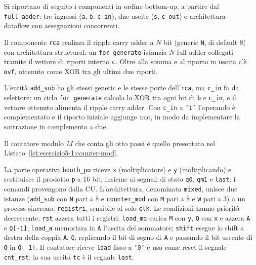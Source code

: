 \implementazione

Si riportano di seguito i componenti in ordine bottom-up, a partire dal \texttt{full\_adder}: tre ingressi (\texttt{a}, \texttt{b}, \texttt{c\_in}), due uscite (\texttt{s}, \texttt{c\_out}) e architettura dataflow con assegnazioni concorrenti.


Il componente \texttt{rca} realizza il ripple carry adder a $N$ bit (generic \texttt{N}, di default 8) con architettura structural: un \texttt{for generate} istanzia $N$ full adder collegati tramite il vettore di riporti interno \texttt{c}. Oltre alla somma e al riporto in uscita c'è \texttt{ovf}, ottenuto come XOR tra gli ultimi due riporti.


L'entità \texttt{add\_sub} ha gli stessi generic e le stesse porte dell'\texttt{rca}, ma \texttt{c\_in} fa da selettore: un ciclo \texttt{for generate} calcola lo XOR tra ogni bit di \texttt{b} e \texttt{c\_in}, e il vettore ottenuto alimenta il ripple carry adder. Con \texttt{c\_in} a \texttt{'1'} l'operando è complementato e il riporto iniziale aggiunge uno, in modo da implementare la sottrazione in complemento a due.


Il contatore modulo $M$ che conta gli otto passi è quello presentato nel Listato~\ref{lst:esercizio5-1:counter-mod}.

La parte operativa \texttt{booth\_po} riceve \texttt{x} (moltiplicatore) e \texttt{y} (moltiplicando) e restituisce il prodotto \texttt{p} a 16 bit, insieme ai segnali di stato \texttt{q0}, \texttt{qm1} e \texttt{last}; i comandi provengono dalla CU. L'architettura, denominata \texttt{mixed}, unisce due istanze (\texttt{add\_sub} con \texttt{N} pari a 8 e \texttt{counter\_mod} con \texttt{M} pari a 8 e \texttt{W} pari a 3) a un process sincrono, \texttt{registri}, sensibile al solo \texttt{clk}. Le condizioni hanno priorità decrescente: \texttt{rst} azzera tutti i registri; \texttt{load\_mq} carica \texttt{M} con \texttt{y}, \texttt{Q} con \texttt{x} e azzera \texttt{A} e \texttt{Q[-1]}; \texttt{load\_a} memorizza in \texttt{A} l'uscita del sommatore; \texttt{shift} esegue lo shift a destra della coppia \texttt{A}, \texttt{Q}, replicando il bit di segno di \texttt{A} e passando il bit uscente di \texttt{Q} in \texttt{Q[-1]}. Il contatore riceve \texttt{load} fisso a \texttt{'0'} e usa come reset il segnale \texttt{cnt\_rst}; la sua uscita \texttt{tc} è il segnale \texttt{last}.


